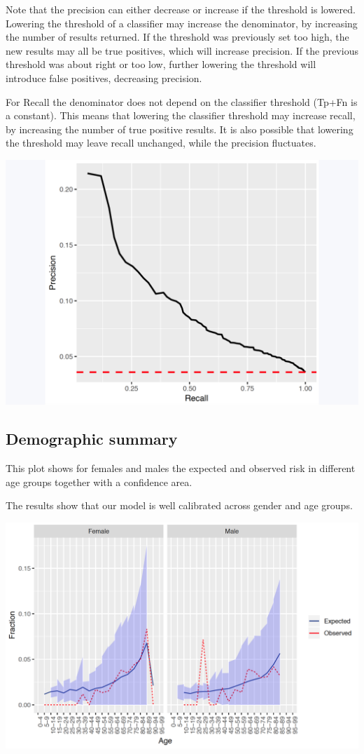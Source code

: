\documentclass[]{book}
\begin{document}
Note that the precision can either decrease or increase if the threshold
is lowered. Lowering the threshold of a classifier may increase the
denominator, by increasing the number of results returned. If the
threshold was previously set too high, the new results may all be true
positives, which will increase precision. If the previous threshold was
about right or too low, further lowering the threshold will introduce
false positives, decreasing precision.

For Recall the denominator does not depend on the classifier threshold
(Tp+Fn is a constant). This means that lowering the classifier threshold
may increase recall, by increasing the number of true positive results.
It is also possible that lowering the threshold may leave recall
unchanged, while the precision fluctuates.

\includegraphics{images/PatientLevelPrediction/precisionRecall.png}

\newpage

\subsection{Demographic summary}\label{demographic-summary}

This plot shows for females and males the expected and observed risk in
different age groups together with a confidence area.

The results show that our model is well calibrated across gender and age
groups.

\includegraphics{images/PatientLevelPrediction/demographicSummary.png}
\end{document}

